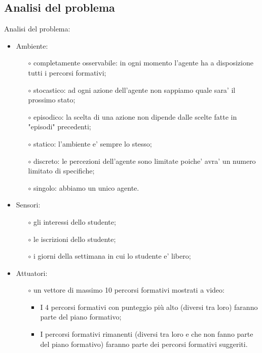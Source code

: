 \documentclass[10pt,a4paper]{article}
\begin{document}
   
    \subsection{Analisi del problema}
      \label{analisiDelProblemaSubsection}
      Analisi del problema:\\
      \begin{itemize}
        \item Ambiente:
        \begin{itemize}
          \item[$\circ$] completamente osservabile: in ogni momento l'agente ha a disposizione tutti i percorsi formativi;
          \item[$\circ$] stocastico: ad ogni azione dell'agente non sappiamo quale sara' il prossimo stato;
          \item[$\circ$] episodico: la scelta di una azione non dipende dalle scelte fatte in "episodi" precedenti;
          \item[$\circ$] statico: l'ambiente e' sempre lo stesso;
          \item[$\circ$] discreto: le percezioni dell'agente sono limitate poiche' avra' un numero limitato di specifiche;
          \item[$\circ$] singolo: abbiamo un unico agente.
        \end{itemize}
        
        \item Sensori:
        \begin{itemize}
          \item[$\circ$] gli interessi dello studente;
          \item[$\circ$] le iscrizioni dello studente;
          \item[$\circ$] i giorni della settimana in cui lo studente e' libero;
        \end{itemize}
        
        \item Attuatori:
        \begin{itemize}
          \item[$\circ$] un vettore di massimo 10 percorsi formativi mostrati a video:
          \begin{itemize}
            \item I 4 percorsi formativi con punteggio più alto (diversi tra loro) faranno parte del piano formativo;
            \item I percorsi formativi rimanenti (diversi tra loro e che non fanno parte 
            del piano formativo) faranno parte dei percorsi formativi suggeriti. 
          \end{itemize}
        \end{itemize}
      \end{itemize}%
        
\end{document}

